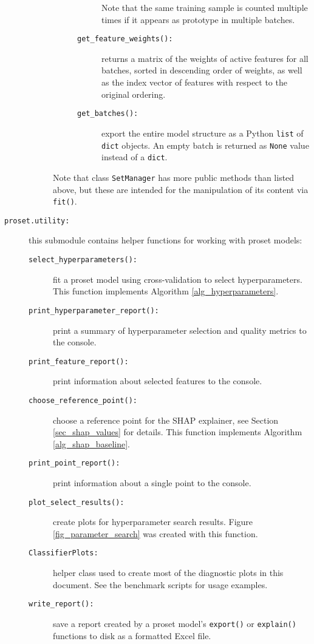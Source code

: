 \begin{description}
\begin{description}
\begin{description}
\begin{description}
Note that the same training sample is counted multiple times if it appears as prototype in multiple batches.
%
\item[\texttt{get\_feature\_weights():}] returns a matrix of the weights of active features for all batches, sorted in descending order of weights, as well as the index vector of features with respect to the original ordering.
%
\item[\texttt{get\_batches():}] export the entire model structure as a Python \texttt{list} of \texttt{dict} objects.
An empty batch is returned as \texttt{None} value instead of a \texttt{dict}.
\end{description}
\end{description}
%
Note that class \texttt{SetManager} has more public methods than listed above, but these are intended for the manipulation of its content via \texttt{fit()}.
%
\end{description}
%
\item[\texttt{proset.utility:}] this submodule contains helper functions for working with proset models:
%
\begin{description}
\item[\texttt{select\_hyperparameters():}] fit a proset model using cross-validation to select hyperparameters.
This function implements Algorithm \ref{alg_hyperparameters}.
%
\item[\texttt{print\_hyperparameter\_report():}] print a summary of hyperparameter selection and quality metrics to the console.
%
\item[\texttt{print\_feature\_report():}] print information about selected features to the console.
%
\item[\texttt{choose\_reference\_point():}] choose a reference point for the SHAP explainer, see Section \ref{sec_shap_values} for details.
This function implements Algorithm \ref{alg_shap_baseline}.
%
\item[\texttt{print\_point\_report():}] print information about a single point to the console.
%
\item[\texttt{plot\_select\_results():}] create plots for hyperparameter search results.
Figure \ref{fig_parameter_search} was created with this function.
%
\item[\texttt{ClassifierPlots:}] helper class used to create most of the diagnostic plots in this document.
See the benchmark scripts for usage examples.
%
\item[\texttt{write\_report():}] save a report created by a proset model's \texttt{export()} or \texttt{explain()} functions to disk as a formatted Excel file.

\end{description}
\end{description}
